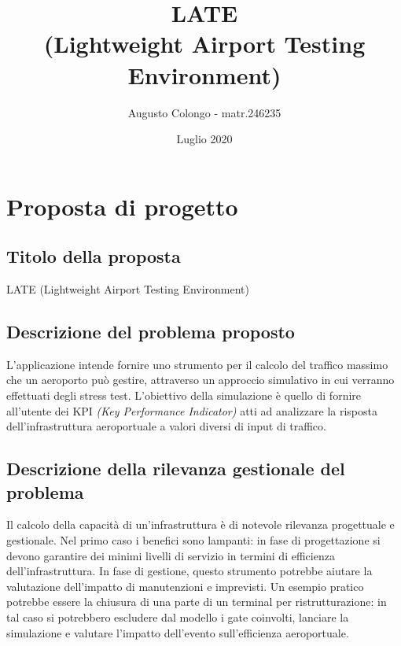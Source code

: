 \documentclass[a4paper, 12pt]{article}
\begin{document}



\title{LATE \\ 
	\large (Lightweight Airport Testing Environment)\\
}

\author{Augusto Colongo - matr.246235}
\date{Luglio 2020}

\maketitle

\tableofcontents

\listoffigures

\listoftables

\newpage

\section{Proposta di progetto}
	\subsection{Titolo della proposta}
	
	LATE (Lightweight Airport Testing Environment)
	
	\subsection{Descrizione del problema proposto}
	
	L'applicazione intende fornire uno strumento per il calcolo del traffico massimo che un aeroporto può gestire, attraverso un approccio simulativo in cui verranno effettuati degli stress test. L'obiettivo della simulazione è quello di fornire all'utente dei KPI \textit{(Key Performance Indicator)} atti ad analizzare la risposta dell'infrastruttura aeroportuale a valori diversi di input di traffico.
	
	\subsection{Descrizione della rilevanza gestionale del problema}
	
	Il calcolo della capacità di un'infrastruttura è di notevole rilevanza progettuale e gestionale.
	Nel primo caso i benefici sono lampanti: in fase di progettazione si devono garantire dei minimi livelli di servizio in termini di efficienza dell'infrastruttura.
	In fase di gestione, questo strumento potrebbe aiutare la valutazione dell'impatto di manutenzioni e imprevisti.
	Un esempio pratico potrebbe essere la chiusura di una parte di un terminal per ristrutturazione: in tal caso si potrebbero escludere dal modello i gate coinvolti, lanciare la simulazione e valutare l'impatto dell'evento sull'efficienza aeroportuale.
	
\end{document}
